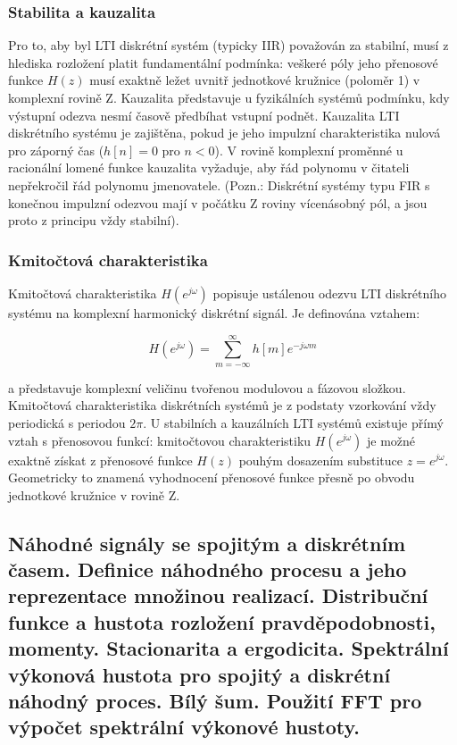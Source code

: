     \subsubsection{Stabilita a kauzalita}
        Pro to, aby byl LTI diskrétní systém (typicky IIR) považován za stabilní, musí z hlediska rozložení platit fundamentální podmínka: veškeré póly jeho přenosové funkce $H(z)$ musí exaktně ležet uvnitř jednotkové kružnice (poloměr 1) v komplexní rovině Z. Kauzalita představuje u fyzikálních systémů podmínku, kdy výstupní odezva nesmí časově předbíhat vstupní podnět. Kauzalita LTI diskrétního systému je zajištěna, pokud je jeho impulzní charakteristika nulová pro záporný čas ($h[n] = 0$ pro $n < 0$). V rovině komplexní proměnné u racionální lomené funkce kauzalita vyžaduje, aby řád polynomu v čitateli nepřekročil řád polynomu jmenovatele. (Pozn.: Diskrétní systémy typu FIR s konečnou impulzní odezvou mají v počátku Z roviny vícenásobný pól, a jsou proto z principu vždy stabilní).

    \subsubsection{Kmitočtová charakteristika}
        Kmitočtová charakteristika $H(e^{j\omega})$ popisuje ustálenou odezvu LTI diskrétního systému na komplexní harmonický diskrétní signál. Je definována vztahem:

        \begin{equation*}
        H(e^{j\omega}) = \sum_{m=-\infty}^{\infty} h[m]e^{-j\omega m}
        \end{equation*}
        
        a představuje komplexní veličinu tvořenou modulovou a fázovou složkou. Kmitočtová charakteristika diskrétních systémů je z podstaty vzorkování vždy periodická s periodou $2\pi$. U stabilních a kauzálních LTI systémů existuje přímý vztah s přenosovou funkcí: kmitočtovou charakteristiku $H(e^{j\omega})$ je možné exaktně získat z přenosové funkce $H(z)$ pouhým dosazením substituce $z = e^{j\omega}$. Geometricky to znamená vyhodnocení přenosové funkce přesně po obvodu jednotkové kružnice v rovině Z.
\subsection{Náhodné signály se spojitým a diskrétním časem. Definice náhodného procesu a jeho reprezentace množinou realizací. Distribuční funkce a hustota rozložení pravděpodobnosti, momenty. Stacionarita a ergodicita. Spektrální výkonová hustota pro spojitý a diskrétní náhodný proces. Bílý šum. Použití FFT pro výpočet spektrální výkonové hustoty.}
